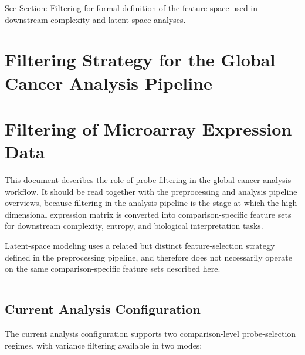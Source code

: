 \documentclass[
  letterpaper,
  DIV=11,
  numbers=noendperiod,
  openany,
  oneside]{scrreprt}
\begin{document}
See Section: Filtering for formal definition of the feature space used
in downstream complexity and latent-space analyses.

\chapter{Filtering Strategy for the Global Cancer Analysis
Pipeline}\label{filtering-strategy-for-the-global-cancer-analysis-pipeline}

\chapter{Filtering of Microarray Expression
Data}\label{filtering-of-microarray-expression-data}

This document describes the role of probe filtering in the global cancer
analysis workflow. It should be read together with the preprocessing and
analysis pipeline overviews, because filtering in the analysis pipeline
is the stage at which the high-dimensional expression matrix is
converted into comparison-specific feature sets for downstream
complexity, entropy, and biological interpretation tasks.

Latent-space modeling uses a related but distinct feature-selection
strategy defined in the preprocessing pipeline, and therefore does not
necessarily operate on the same comparison-specific feature sets
described here.

\begin{center}\rule{0.5\linewidth}{0.5pt}\end{center}

\section{Current Analysis
Configuration}\label{current-analysis-configuration}

The current analysis configuration supports two comparison-level
probe-selection regimes, with variance filtering available in two modes:
\end{document}
